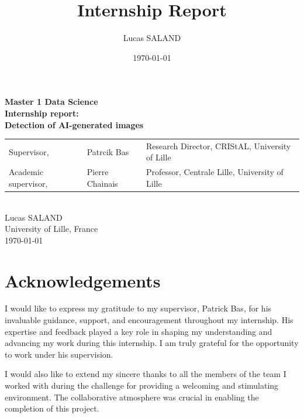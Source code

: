 \documentclass[12pt,a4paper]{article}
\title{Internship Report}
\author{Lucas SALAND}
\date{\today}
\begin{document}
\begin{titlepage}
    \begin{center}
        \Large
        \textbf{Master 1 Data Science}\\
        \vspace*{.5cm}
        \LARGE
        \textbf{Internship report: \\Detection of AI-generated images}\\
        \vspace{1cm}
        \small
        \vfill
        \begin{tabular}{lll}
            Supervisor, & Patrcik Bas & Research Director, CRIStAL, University of Lille\\
            Academic supervisor, & Pierre Chainais & Professor, Centrale Lille, University of Lille\\
        \end{tabular}
        \vspace{1cm}\\
        \large
        Lucas SALAND\\
        University of Lille, France\\
        \today\\
    \end{center}
\end{titlepage}
\newpage
\section*{Acknowledgements}
I would like to express my gratitude to my supervisor, Patrick Bas, for his invaluable guidance, support, and encouragement throughout my internship. His expertise and feedback played a key role in shaping my understanding and advancing my work during this internship. I am truly grateful for the opportunity to work under his supervision.

\noindent I would also like to extend my sincere thanks to all the members of the team I worked with during the challenge for providing a welcoming and stimulating environment. The collaborative atmosphere was crucial in enabling the completion of this project.

\newpage

\tableofcontents
\newpage
\end{document}
